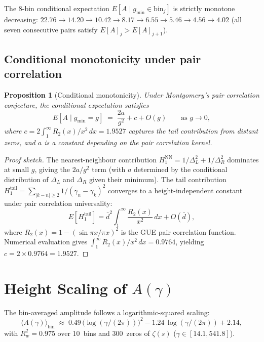 \documentclass[11pt,a4paper]{article}
\theoremstyle{plain}
\newtheorem{proposition}[theorem]{Proposition}
\theoremstyle{definition}
\begin{document}
The $8$-bin conditional expectation $E[A \mid g_{\min} \in \text{bin}_j]$
is strictly monotone decreasing: $22.76 \to 14.20 \to 10.42 \to 8.17
\to 6.55 \to 5.46 \to 4.56 \to 4.02$ (all seven consecutive pairs
satisfy $E[A]_{j} > E[A]_{j+1}$).


\subsection{Conditional monotonicity under pair correlation}
\label{subsec:conditional}

\begin{proposition}[Conditional monotonicity]\label{prop:conditional}
Under Montgomery's pair correlation conjecture, the conditional
expectation satisfies
\[
  E[A \mid g_{\min} = g] \;=\; \frac{2a}{g^2} + c + O(g)
  \qquad \text{as } g \to 0,
\]
where $c = 2\int_1^\infty R_2(x)/x^2\,dx = 1.9527$ captures the
tail contribution from distant zeros, and $a$ is a constant
depending on the pair correlation kernel.
\end{proposition}

\begin{proof}[Proof sketch]
The nearest-neighbour contribution $H_1^{\mathrm{NN}} =
1/\Delta_L^2 + 1/\Delta_R^2$ dominates at small $g$, giving
the $2a/g^2$ term (with $a$ determined by the conditional
distribution of $\Delta_L$ and $\Delta_R$ given their minimum).
The tail contribution $H_1^{\mathrm{tail}} =
\sum_{|k-n| \ge 2} 1/(\gamma_n - \gamma_k)^2$ converges to a
height-independent constant under pair correlation universality:
\[
  E[H_1^{\mathrm{tail}}] = \bar{d}^2 \int_1^\infty
  \frac{R_2(x)}{x^2}\,dx + O(\bar{d}),
\]
where $R_2(x) = 1 - (\sin\pi x/\pi x)^2$ is the GUE pair
correlation function.
Numerical evaluation gives
$\int_1^\infty R_2(x)/x^2\,dx = 0.9764$, yielding
$c = 2 \times 0.9764 = 1.9527$.
\end{proof}


\section{Height Scaling of $A(\gamma)$}
\label{sec:height}

The bin-averaged amplitude follows a logarithmic-squared scaling:
\begin{equation}\label{eq:height_scaling}
  \langle A(\gamma) \rangle_{\mathrm{bin}}
  \;\approx\; 0.49\,\bigl(\log(\gamma/(2\pi))\bigr)^2
  - 1.24\,\log(\gamma/(2\pi)) + 2.14,
\end{equation}
with $R^2_w = 0.975$ over 10~bins and 300~zeros of $\zeta(s)$
($\gamma \in [14.1, 541.8]$).
\end{document}
